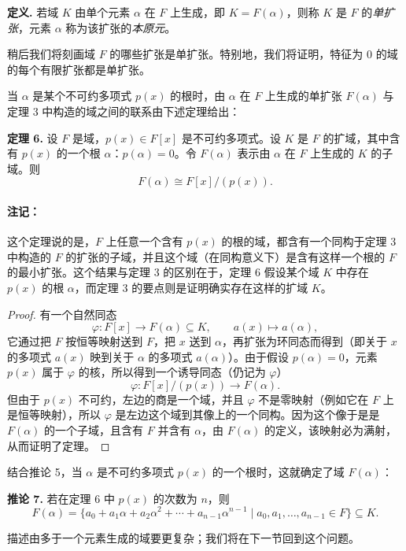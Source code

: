 \noindent\textbf{定义.} 若域 $K$ 由单个元素 $\alpha$ 在 $F$ 上生成，即 $K=F(\alpha)$，则称 $K$ 是 $F$ 的\emph{单扩张}，元素 $\alpha$ 称为该扩张的\emph{本原元}。

稍后我们将刻画域 $F$ 的哪些扩张是单扩张。特别地，我们将证明，特征为 $0$ 的域的每个有限扩张都是单扩张。

当 $\alpha$ 是某个不可约多项式 $p(x)$ 的根时，由 $\alpha$ 在 $F$ 上生成的单扩张 $F(\alpha)$ 与定理 3 中构造的域之间的联系由下述定理给出：

\noindent\textbf{定理 6.} 设 $F$ 是域，$p(x)\in F[x]$ 是不可约多项式。设 $K$ 是 $F$ 的扩域，其中含有 $p(x)$ 的一个根 $\alpha$：$p(\alpha)=0$。令 $F(\alpha)$ 表示由 $\alpha$ 在 $F$ 上生成的 $K$ 的子域。则
\[
F(\alpha)\cong F[x]/(p(x)).
\]

\paragraph{注记：} 这个定理说的是，$F$ 上任意一个含有 $p(x)$ 的根的域，都含有一个同构于定理 3 中构造的 $F$ 的扩张的子域，并且这个域（在同构意义下）是含有这样一个根的 $F$ 的最小扩张。这个结果与定理 3 的区别在于，定理 6 假设某个域 $K$ 中存在 $p(x)$ 的根 $\alpha$，而定理 3 的要点则是证明确实存在这样的扩域 $K$。

\begin{proof}
	有一个自然同态
	\[
	\varphi:F[x]\longrightarrow F(\alpha)\subseteq K,
	\qquad
	a(x)\longmapsto a(\alpha),
	\]
	它通过把 $F$ 按恒等映射送到 $F$，把 $x$ 送到 $\alpha$，再扩张为环同态而得到（即关于 $x$ 的多项式 $a(x)$ 映到关于 $\alpha$ 的多项式 $a(\alpha)$）。由于假设 $p(\alpha)=0$，元素 $p(x)$ 属于 $\varphi$ 的核，所以得到一个诱导同态（仍记为 $\varphi$）
	\[
	\varphi:F[x]/(p(x))\longrightarrow F(\alpha).
	\]
	但由于 $p(x)$ 不可约，左边的商是一个域，并且 $\varphi$ 不是零映射（例如它在 $F$ 上是恒等映射），所以 $\varphi$ 是左边这个域到其像上的一个同构。因为这个像于是是 $F(\alpha)$ 的一个子域，且含有 $F$ 并含有 $\alpha$，由 $F(\alpha)$ 的定义，该映射必为满射，从而证明了定理。
\end{proof}

结合推论 5，当 $\alpha$ 是不可约多项式 $p(x)$ 的一个根时，这就确定了域 $F(\alpha)$：

\noindent\textbf{推论 7.} 若在定理 6 中 $p(x)$ 的次数为 $n$，则
\[
F(\alpha)=\{a_0+a_1\alpha+a_2\alpha^2+\cdots+a_{n-1}\alpha^{n-1}\mid a_0,a_1,\ldots,a_{n-1}\in F\}\subseteq K.
\]

描述由多于一个元素生成的域要更复杂；我们将在下一节回到这个问题。

